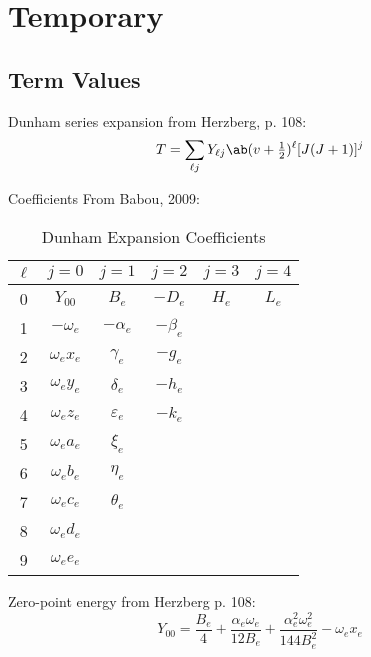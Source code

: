 \documentclass[11pt, twoside, fleqn]{report}
\begin{document}
\chapter{Temporary}

\section{Term Values}

Dunham series expansion from Herzberg, p. 108:
\begin{equation*}
    T = \sum_{\ell j}Y_{\ell j}\ab(v + \tfrac{1}{2})^\ell [J(J + 1)]^j
\end{equation*}

Coefficients From Babou, 2009:
\begin{table}[H]
    \centering
    \caption{Dunham Expansion Coefficients}
    \begin{tabular}{c|ccccc}
        \toprule
        $\ell$ & $j = 0$       & $j = 1$         & $j = 2$    & $j = 3$ & $j = 4$ \\
        \midrule
        0      & $Y_{00}$      & $B_e$           & $-D_e$     & $H_e$   & $L_e$   \\
        1      & $-\omega_e$   & $-\alpha_e$     & $-\beta_e$ &         &         \\
        2      & $\omega_ex_e$ & $\gamma_e$      & $-g_e$     &         &         \\
        3      & $\omega_ey_e$ & $\delta_e$      & $-h_e$     &         &         \\
        4      & $\omega_ez_e$ & $\varepsilon_e$ & $-k_e$     &         &         \\
        5      & $\omega_ea_e$ & $\xi_e$         &            &         &         \\
        6      & $\omega_eb_e$ & $\eta_e$        &            &         &         \\
        7      & $\omega_ec_e$ & $\theta_e$      &            &         &         \\
        8      & $\omega_ed_e$ &                 &            &         &         \\
        9      & $\omega_ee_e$ &                 &            &         &         \\
        \bottomrule
    \end{tabular}
\end{table}

Zero-point energy from Herzberg p. 108:
\begin{equation*}
    Y_{00} = \frac{B_e}{4} + \frac{\alpha_e\omega_e}{12B_e} + \frac{\alpha_e^2\omega_e^2}{144B_e^2} - \omega_ex_e
\end{equation*}
\end{document}
